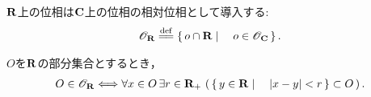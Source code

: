	\begin{screen}
		\begin{dfn}[$\R$上の位相]
			$\R$上の位相は$\mathbf{C}$上の位相の相対位相として導入する:
			\begin{align}
				\mathscr{O}_{\R} \defeq \Set{o \cap \R}{o \in \mathscr{O}_{\C}}.
			\end{align}
		\end{dfn}
	\end{screen}
	
	\begin{screen}
		\begin{thm}[$\R$の開集合はボールから成る]
			$O$を$\R$の部分集合とするとき，
			\begin{align}
				O \in \mathscr{O}_{\mathbf{R}} \Longleftrightarrow
				\forall x \in O\, \exists r \in \mathbf{R}_+\, \left(\, \left\{\, y \in \mathbf{R} \mid \quad |x-y| < r\, \right\} \subset O\, \right).
			\end{align}
		\end{thm}
	\end{screen}